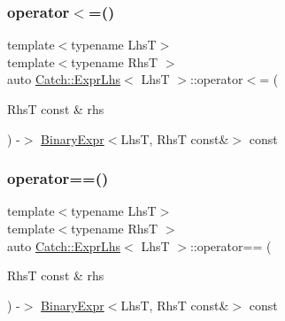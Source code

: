 \mbox{\label{class_catch_1_1_expr_lhs_a6bd8a22c1a7fe2f66d71d7196f20af4f}} 
\subsubsection{\texorpdfstring{operator$<$=()}{operator<=()}}
{\footnotesize\ttfamily template$<$typename LhsT$>$ \\
template$<$typename RhsT $>$ \\
auto \mbox{\hyperlink{class_catch_1_1_expr_lhs}{Catch\+::\+Expr\+Lhs}}$<$ LhsT $>$\+::operator$<$= (\begin{DoxyParamCaption}\item[{RhsT const \&}]{rhs }\end{DoxyParamCaption}) -\/$>$ \mbox{\hyperlink{class_catch_1_1_binary_expr}{Binary\+Expr}}$<$LhsT, RhsT const\&$>$ const \hspace{0.3cm}{\ttfamily [inline]}}

\mbox{\label{class_catch_1_1_expr_lhs_a3068adff1dbbaeec62ffc368d4d6cc4d}} 
\subsubsection{\texorpdfstring{operator==()}{operator==()}\hspace{0.1cm}{\footnotesize\ttfamily [1/2]}}
{\footnotesize\ttfamily template$<$typename LhsT$>$ \\
template$<$typename RhsT $>$ \\
auto \mbox{\hyperlink{class_catch_1_1_expr_lhs}{Catch\+::\+Expr\+Lhs}}$<$ LhsT $>$\+::operator== (\begin{DoxyParamCaption}\item[{RhsT const \&}]{rhs }\end{DoxyParamCaption}) -\/$>$ \mbox{\hyperlink{class_catch_1_1_binary_expr}{Binary\+Expr}}$<$LhsT, RhsT const\&$>$ const \hspace{0.3cm}{\ttfamily [inline]}}

\mbox{\label{class_catch_1_1_expr_lhs_ab707a84abdffbdc35962a495e238d393}} 
